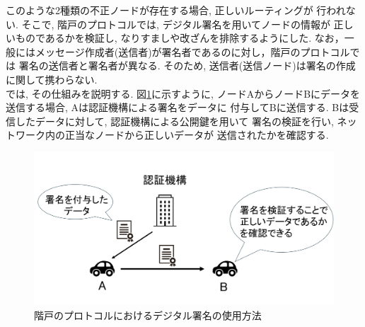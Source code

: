 \indent このような2種類の不正ノードが存在する場合, 正しいルーティングが
行われない. そこで, 階戸のプロトコルでは, デジタル署名を用いてノードの情報が
正しいものであるかを検証し, なりすましや改ざんを排除するようにした. 
なお，一般にはメッセージ作成者(送信者)が署名者であるのに対し，階戸のプロトコルでは
署名の送信者と署名者が異なる. そのため, 送信者(送信ノード)は署名の作成に関して携わらない.  \\
\indent では, その仕組みを説明する. 図\ref{fig:signature-method}に示すように, 
ノードAからノードBにデータを送信する場合, Aは認証機構による署名をデータに
付与してBに送信する. Bは受信したデータに対して, 認証機構による公開鍵を用いて
署名の検証を行い, ネットワーク内の正当なノードから正しいデータが
送信されたかを確認する. 
\newpage

\begin{figure}
  \centering
  \includegraphics[scale=0.6]{figures/signature-method.png}
  \caption{階戸のプロトコルにおけるデジタル署名の使用方法\cite{shinato}}
  \label{fig:signature-method}
\end{figure}


